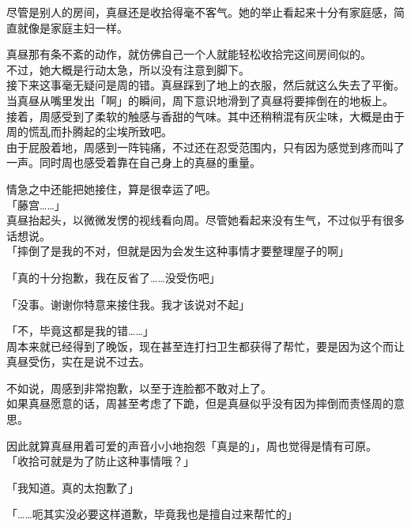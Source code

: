 尽管是别人的房间，真昼还是收拾得毫不客气。她的举止看起来十分有家庭感，简直就像是家庭主妇一样。

真昼那有条不紊的动作，就仿佛自己一个人就能轻松收拾完这间房间似的。\\

不过，她大概是行动太急，所以没有注意到脚下。\\

接下来这事毫无疑问是周的错。真昼踩到了地上的衣服，然后就这么失去了平衡。\\

当真昼从嘴里发出「啊」的瞬间，周下意识地滑到了真昼将要摔倒在的地板上。\\

接着，周感受到了柔软的触感与香甜的气味。其中还稍稍混有灰尘味，大概是由于周的慌乱而扑腾起的尘埃所致吧。\\

由于屁股着地，周感到一阵钝痛，不过还在忍受范围内，只有因为感觉到疼而叫了一声。同时周也感受着靠在自己身上的真昼的重量。

情急之中还能把她接住，算是很幸运了吧。\\

「藤宫……」\\

真昼抬起头，以微微发愣的视线看向周。尽管她看起来没有生气，不过似乎有很多话想说。\\

「摔倒了是我的不对，但就是因为会发生这种事情才要整理屋子的啊」

「真的十分抱歉，我在反省了……没受伤吧」

「没事。谢谢你特意来接住我。我才该说对不起」

「不，毕竟这都是我的错……」\\

周本来就已经得到了晚饭，现在甚至连打扫卫生都获得了帮忙，要是因为这个而让真昼受伤，实在是说不过去。

不如说，周感到非常抱歉，以至于连脸都不敢对上了。\\

如果真昼愿意的话，周甚至考虑了下跪，但是真昼似乎没有因为摔倒而责怪周的意思。

因此就算真昼用着可爱的声音小小地抱怨「真是的」，周也觉得是情有可原。\\

「收拾可就是为了防止这种事情哦？」

「我知道。真的太抱歉了」

「……呃其实没必要这样道歉，毕竟我也是擅自过来帮忙的」\\

